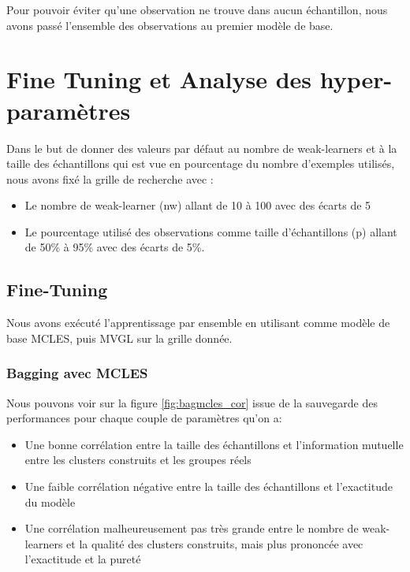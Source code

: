 \documentclass[12pt,a4paper]{report}
\begin{document}
	Pour pouvoir éviter qu'une observation ne trouve dans aucun échantillon, nous avons passé l'ensemble des observations au premier modèle de base.
    
	\section{Fine Tuning et Analyse des hyper-paramètres}
	Dans le but de donner des valeurs par défaut au nombre de weak-learners et à la taille des échantillons qui est vue en pourcentage du nombre d'exemples utilisés, nous avons fixé la grille de recherche avec :

	\begin{itemize}
    	\item Le nombre de weak-learner (nw) allant de 10 à 100 avec des écarts de 5
    	\item Le pourcentage utilisé des observations comme taille d'échantillons (p) allant de 50\% à 95\% avec des écarts de 5\%.
	\end{itemize}
    
    	\subsection{Fine-Tuning}
        	Nous avons exécuté l'apprentissage par ensemble en utilisant comme modèle de base MCLES, puis MVGL sur la grille donnée.
       	 
        	\subsubsection{Bagging avec MCLES}

        	Nous pouvons voir sur la figure \ref{fig:bagmcles_cor} issue de la sauvegarde des performances pour chaque couple de paramètres qu'on a:
        	\begin{itemize}
            	\item Une bonne corrélation entre la taille des échantillons et l'information mutuelle entre les clusters construits et les groupes réels
            	\item Une faible corrélation négative entre la taille des échantillons et l'exactitude du modèle
            	\item Une corrélation malheureusement pas très grande entre le nombre de weak-learners et la qualité des clusters construits, mais plus prononcée avec l'exactitude et la pureté
        	\end{itemize}
       	 
\end{document}
